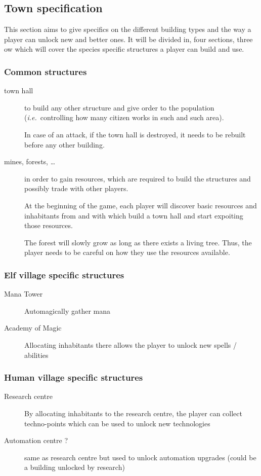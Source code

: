 \documentclass{article}
\def\ie{\textit{i.e.}}
\begin{document}
\subsection{Town specification}
This section aims to give specifics on the different building types and the way a player can
unlock new and better ones. It will be divided in, four sections, three ow which will cover the
species specific structures a player can build and use.

\subsubsection{Common structures}
\begin{description}
    \item[town hall] to build any other structure and give order to the population (\ie~controlling
    how many citizen works in such and such area).

    In case of an attack, if the town hall is destroyed, it needs to be rebuilt before any other
    building.

    \item[mines, forests, \dots] in order to gain resources, which are required to build the
    structures and possibly trade with other players.

    At the beginning of the game, each player will discover basic resources and inhabitants from
    and with which build a town hall and start expoiting those resources.

    \medskip
    The forest will slowly grow as long as there exists a living tree. Thus, the player needs to
    be careful on how they use the resources available.
\end{description}

\subsubsection{Elf village specific structures}
\begin{description}
    \item[Mana Tower] Automagically gather mana
    \item[Academy of Magic]  Allocating inhabitants there allows the player to unlock new spells / abilities
\end{description}
\subsubsection{Human village specific structures}
\begin{description}
    \item[Research centre] By allocating inhabitants to the research centre, the player can collect
    techno-points which can be used to unlock new technologies
    \item[Automation centre ?] same as research centre but used to unlock automation upgrades (could be a building unlocked by research)
\end{description}
\end{document}
